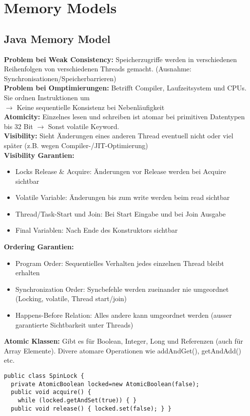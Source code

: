 
\section{Memory Models}
\subsection{Java Memory Model}
\textcolor{b}{\textbf{Problem bei Weak Consistency:}} Speicherzugriffe werden in verschiedenen Reihenfolgen von verschiedenen Threads gemacht. (Ausnahme: Synchronisationen/Speicherbarrieren)\\
\textcolor{b}{\textbf{Problem bei Omptimierungen:}} Betrifft Compiler, Laufzeitsystem und CPUs. Sie ordnen Instruktionen um\\
$\rightarrow$ Keine sequentielle Konsistenz bei Nebenläufigkeit\\
\textcolor{b}{\textbf{Atomicity:}} Einzelnes lesen und schreiben ist atomar bei primitiven Datentypen bis 32 Bit $\rightarrow$ Sonst \textcolor{b}{volatile} Keyword.\\
\textcolor{b}{\textbf{Visibility:}} Sieht Änderungen eines anderen Thread eventuell nicht oder viel später (z.B. wegen Compiler-/JIT-Optimierung)\\
\textbf{Visibility Garantien:}
\begin{itemize}[topsep=0pt, leftmargin=3mm]
    \setlength\itemsep{-0.3em}
    \item Locks Release \& Acquire: Änderungen vor Release werden bei Acquire sichtbar
    \item Volatile Variable: Änderungen bis zum write werden beim read sichtbar
    \item Thread/Task-Start und Join: Bei Start Eingabe und bei Join Ausgabe
    \item Final Variablen: Nach Ende des Konstruktors sichtbar
\end{itemize}
\textcolor{b}{\textbf{Ordering Garantien:}}
\begin{itemize}[topsep=0pt, leftmargin=3mm]
    \setlength\itemsep{-0.3em}
    \item Program Order: Sequentielles Verhalten jedes einzelnen Thread bleibt erhalten
    \item Synchronization Order: Syncbefehle werden zueinander nie umgeordnet (Locking, volatile, Thread start/join)
    \item Happens-Before Relation: Alles andere kann umgeordnet werden (ausser garantierte Sichtbarkeit unter Threads)
\end{itemize}
\textcolor{b}{\textbf{Atomic Klassen:}} Gibt es für \textcolor{b}{Boolean, Integer, Long} und \textcolor{b}{Referenzen} (auch für Array Elemente). Divere atomare Operationen wie \textcolor{b}{addAndGet(), getAndAdd()} etc.
\begin{lstlisting}
public class SpinLock {
  private AtomicBoolean locked=new AtomicBoolean(false);
  public void acquire() {
    while (locked.getAndSet(true)) { }
  public void release() { locked.set(false); } }
\end{lstlisting}
